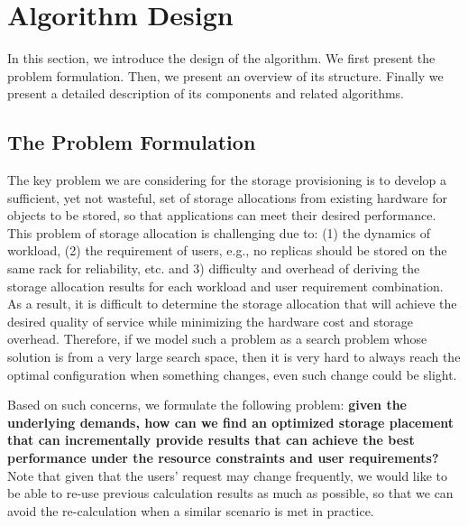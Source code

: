 \section{Algorithm Design}
\label{sec:design}

In this section, we introduce the design of the algorithm. We first present the problem formulation. Then, we present an overview of its structure. Finally we present a detailed description of its components and related algorithms.


\subsection{The Problem Formulation}
\label{problemformulation}

The key problem we are considering for the storage provisioning is to develop a sufficient, yet not wasteful, set of storage allocations from existing hardware for objects to be stored, so that applications can meet their desired performance. This problem of storage allocation is challenging due to: (1) the dynamics of workload, (2) the requirement of users, e.g., no replicas should be stored on the same rack for reliability, etc. and 3) difficulty and overhead of deriving the storage allocation results for each workload and user requirement combination. As
a result, it is difficult to determine the storage allocation that will
achieve the desired quality of service while minimizing the hardware cost and storage overhead. Therefore, if we model such a problem as a search problem whose solution is from a very large search space, then it is very hard to always reach the optimal configuration when something changes, even such change could be slight.
%

Based on such concerns, we formulate the following problem: \textbf{given the underlying demands, how can we find an optimized storage placement that can incrementally provide results that can achieve the best performance under the resource constraints and user requirements?} Note that given that the users' request may change frequently, we would like to be able to re-use previous calculation results as much as possible, so that we can avoid the re-calculation when a similar scenario is met in practice.

